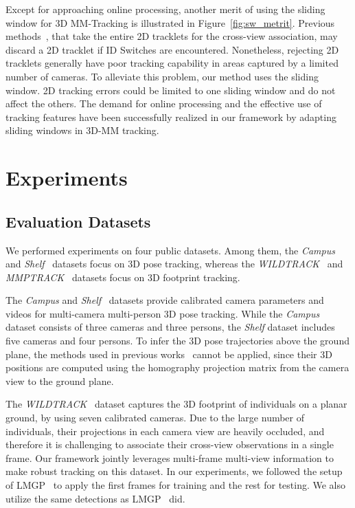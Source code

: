 \documentclass{CVM}
\begin{document}
  
  Except for approaching online processing, another merit of using the sliding window for 3D MM-Tracking is illustrated in Figure~\ref{fig:sw_metrit}. Previous methods~\cite{sternig2011multi,wen2017multi,kohl2020mta, he2020multi}, that take the entire 2D tracklets for the cross-view association, may discard a 2D tracklet if ID Switches are encountered. Nonetheless, rejecting 2D tracklets generally have poor tracking capability in areas captured by a limited number of cameras. To alleviate this problem, our method uses the sliding window. 2D tracking errors could be limited to one sliding window and do not affect the others.
  The demand for online processing and the effective use of tracking features have been successfully realized in our framework by adapting sliding windows in 3D-MM tracking. 


\section{Experiments}

\subsection{Evaluation Datasets}
We performed experiments on four public datasets. Among them, the \textit{Campus} and \textit{Shelf}~\cite{fleuret2007multicamera,BelagiannisAASN16} datasets focus on 3D pose tracking, whereas the \textit{WILDTRACK}~\cite{chavdarova2018wildtrack} and \textit{MMPTRACK}~\cite{han2021mmptrack} datasets focus on 3D footprint tracking.


The \textit{Campus} and \textit{Shelf}~\cite{fleuret2007multicamera, BelagiannisAASN16} datasets provide calibrated camera parameters and videos for multi-camera multi-person 3D pose tracking.
While the \textit{Campus} dataset consists of three cameras and three persons, the \textit{Shelf} dataset includes five cameras and four persons. To infer the 3D pose trajectories above the ground plane, the methods used in previous works~\cite{sternig2011multi,wen2017multi,kohl2020mta,he2020multi} cannot be applied, since their 3D positions are computed using the homography projection matrix from the camera view to the ground plane.


The \textit{WILDTRACK}~\cite{chavdarova2018wildtrack} dataset captures the 3D footprint of  individuals on a planar ground, by using seven calibrated cameras. Due to the large number of individuals, their projections in each camera view are heavily occluded, and therefore it is challenging to associate their cross-view observations in a single frame. Our framework jointly leverages multi-frame multi-view information to make robust tracking on this dataset. In our experiments, we followed the setup of LMGP~\cite{nguyen2022lmgp} to apply the first  frames for training and the rest for testing. We also utilize the same detections as LMGP~\cite{nguyen2022lmgp} did.
\end{document}

